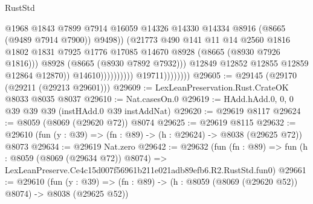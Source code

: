 \begin{lexlean}{RustStd}
\begin{coremodule}
                                                  @1968
                                                  @1843
                                                  @7899
                                                  @7914
                                                  @16059
                                                  @14326
                                                  @14330
                                                  @14334
                                                  @8916
                                                  (@8665 (@9489 @7914 @7900))
                                                  @9498))
                                              (@21773
                                                @490
                                                @141
                                                @11
                                                @14
                                                @2560
                                                @1816
                                                @1802
                                                @1831
                                                @7925
                                                @1776
                                                @17085
                                                @14670
                                                @8928
                                                (@8665 (@8930 @7926 @1816)))
                                              @8928
                                              (@8665 (@8930 @7892 @7932)))
                                            @12849
                                            @12852
                                            @12855
                                            @12859
                                            @12864
                                            @12870))
                                        @14610))))))))))
                    @19711))))))))
@29605 := @29145 (@29170 (@29211 (@29213 @29601)))
@29609 := LexLeanPreservation.Rust.CrateOK @8033 @8035 @8037
@29610 := Nat.casesOn.{0}
@29619 := HAdd.hAdd.{0, 0, 0} @39 @39 @39 (instHAdd.{0} @39 instAddNat)
@29620 := @29619 @8117
@29624 := @8059 (@8069 (@29620 @72)) @8074
@29625 := @29619 @8115
@29632 := @29610 (fun (y : @39) => (fn : @89) -> (h : @29624) -> @8038 (@29625 @72)) @8073
@29634 := @29619 Nat.zero
@29642 := @29632
    (fun (fn : @89) =>
    fun (h : @8059 (@8069 (@29634 @72)) @8074) =>
    LexLeanPreserve.Ce4c15d007f56961b211e021adb89efb6.R2.RustStd.fun0)
@29661 := @29610
    (fun (y : @39) => (fn : @89) -> (h : @8059 (@8069 (@29620 @52)) @8074) -> @8038 (@29625 @52))

\end{coremodule}
\end{lexlean}
